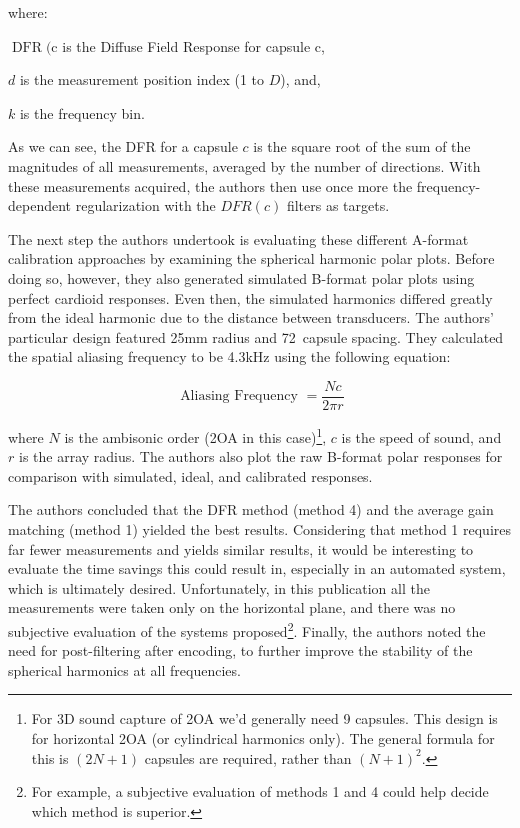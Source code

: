 \noindent where:

\begin{description}
\item  $\operatorname{DFR}(\mathrm{c}$ is the Diffuse Field Response for capsule $\mathrm{c}$,
\item $d$ is the measurement position index (1 to $D$), and,
\item $k$ is the frequency bin.
\end{description}

As we can see, the DFR for a capsule $c$ is the square root of the sum of the magnitudes of all measurements, averaged by the number of directions. With these measurements acquired, the authors then use once more the frequency-dependent regularization with the $DFR(c)$ filters as targets.

The next step the authors undertook is evaluating these different A-format calibration approaches by examining the spherical harmonic polar plots. Before doing so, however, they also generated simulated B-format polar plots using perfect cardioid responses. Even then, the simulated harmonics differed greatly from the ideal harmonic due to the distance between transducers. The authors' particular design featured 25mm radius and 72\textdegree \ capsule spacing. They calculated the spatial aliasing frequency to be 4.3kHz using the following equation:

$$
\text { Aliasing Frequency }=\frac{N c}{2 \pi r}
$$

where $N$ is the ambisonic order (2OA in this case)\footnote{For 3D sound capture of 2OA we'd generally need 9 capsules. This design is for horizontal 2OA (or cylindrical harmonics only). The general formula for this is $(2N + 1)$ capsules are required, rather than $(N + 1)^2$.}, $c$ is the speed of sound, and $r$ is the array radius. The authors also plot the raw B-format polar responses for comparison with simulated, ideal, and calibrated responses.

The authors concluded that the DFR method (method 4) and the average gain matching (method 1) yielded the best results. Considering that method 1 requires far fewer measurements and yields similar results, it would be interesting to evaluate the time savings this could result in, especially in an automated system, which is ultimately desired. Unfortunately, in this publication all the measurements were taken only on the horizontal plane, and there was no subjective evaluation of the systems proposed\footnote{For example, a subjective evaluation of methods 1 and 4 could help decide which method is superior.}. Finally, the authors noted the need for post-filtering after encoding, to further improve the stability of the spherical harmonics at all frequencies.

